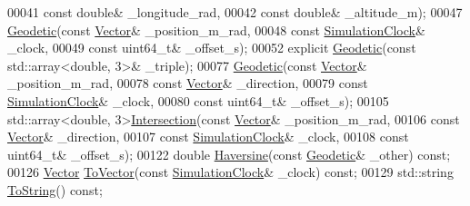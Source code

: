 \begin{DoxyCode}
00041            \textcolor{keyword}{const} \textcolor{keywordtype}{double}& \_longitude\_rad,
00042            \textcolor{keyword}{const} \textcolor{keywordtype}{double}& \_altitude\_m);
00047   \hyperlink{classosse_1_1collaborate_1_1_geodetic_a8c111a79dfe50da43aa21f6256ffa13c}{Geodetic}(\textcolor{keyword}{const} \hyperlink{classosse_1_1collaborate_1_1_vector}{Vector}& \_position\_m\_rad,
00048            \textcolor{keyword}{const} \hyperlink{classosse_1_1collaborate_1_1_simulation_clock}{SimulationClock}& \_clock,
00049            \textcolor{keyword}{const} uint64\_t& \_offset\_s);
00052   \textcolor{keyword}{explicit} \hyperlink{classosse_1_1collaborate_1_1_geodetic_a8c111a79dfe50da43aa21f6256ffa13c}{Geodetic}(\textcolor{keyword}{const} std::array<double, 3>& \_triple);
00077   \hyperlink{classosse_1_1collaborate_1_1_geodetic_a8c111a79dfe50da43aa21f6256ffa13c}{Geodetic}(\textcolor{keyword}{const} \hyperlink{classosse_1_1collaborate_1_1_vector}{Vector}& \_position\_m\_rad,
00078            \textcolor{keyword}{const} \hyperlink{classosse_1_1collaborate_1_1_vector}{Vector}& \_direction,
00079            \textcolor{keyword}{const} \hyperlink{classosse_1_1collaborate_1_1_simulation_clock}{SimulationClock}& \_clock,
00080            \textcolor{keyword}{const} uint64\_t& \_offset\_s);
00105   std::array<double, 3>\hyperlink{classosse_1_1collaborate_1_1_geodetic_a6ef067b2b517a75ddb0c5fa76449d27b}{Intersection}(\textcolor{keyword}{const} \hyperlink{classosse_1_1collaborate_1_1_vector}{Vector}& \_position\_m\_rad,
00106                                     \textcolor{keyword}{const} \hyperlink{classosse_1_1collaborate_1_1_vector}{Vector}& \_direction,
00107                                     \textcolor{keyword}{const} \hyperlink{classosse_1_1collaborate_1_1_simulation_clock}{SimulationClock}& \_clock,
00108                                     \textcolor{keyword}{const} uint64\_t& \_offset\_s);
00122   \textcolor{keywordtype}{double} \hyperlink{classosse_1_1collaborate_1_1_geodetic_a7f70ddcb884dbf99264e3e7e92ac7948}{Haversine}(\textcolor{keyword}{const} \hyperlink{classosse_1_1collaborate_1_1_geodetic}{Geodetic}& \_other) \textcolor{keyword}{const};
00126   \hyperlink{classosse_1_1collaborate_1_1_vector}{Vector} \hyperlink{classosse_1_1collaborate_1_1_geodetic_a4a46857018f20a00720e05fe705828ec}{ToVector}(\textcolor{keyword}{const} \hyperlink{classosse_1_1collaborate_1_1_simulation_clock}{SimulationClock}& \_clock) \textcolor{keyword}{const};
00129   std::string \hyperlink{classosse_1_1collaborate_1_1_geodetic_ac2fee1f9452db5b6543962cc5ff54cc0}{ToString}() \textcolor{keyword}{const};

\end{DoxyCode}
